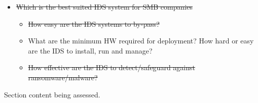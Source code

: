 \begin{notes}

    \begin{itemize}
        \item \sout{Which is the best suited IDS system for SMB companies}
        \begin{itemize}
            \item \sout{How easy are the IDS systems to by-pass?}
            \item What are the minimum HW required for deployment? How hard or easy are the IDS to install, run and manage?
            \item \sout{How effective are the IDS to detect/safeguard against ransomware/malware?}
        \end{itemize}

    \end{itemize}
    
    Section content being assessed.
    
\end{notes}